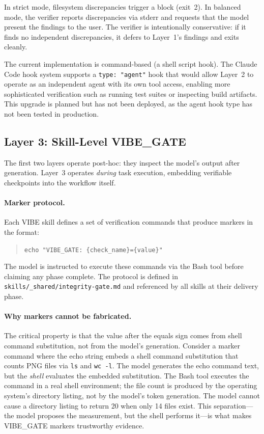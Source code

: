 In strict mode, filesystem discrepancies trigger a block (exit~2).
In balanced mode, the verifier reports discrepancies via stderr and requests that the model present the findings to the user.
The verifier is intentionally conservative: if it finds no independent discrepancies, it defers to Layer~1's findings and exits cleanly.

The current implementation is command-based (a shell script hook).
The Claude Code hook system supports a \texttt{type: "agent"} hook that would allow Layer~2 to operate as an independent agent with its own tool access, enabling more sophisticated verification such as running test suites or inspecting build artifacts.
This upgrade is planned but has not been deployed, as the agent hook type has not been tested in production.


\subsection{Layer 3: Skill-Level VIBE\_GATE}
\label{sec:vibegate}

The first two layers operate post-hoc: they inspect the model's output after generation.
Layer~3 operates \emph{during} task execution, embedding verifiable checkpoints into the workflow itself.

\paragraph{Marker protocol.}
Each VIBE skill defines a set of verification commands that produce markers in the format:
\begin{quote}
\texttt{echo "VIBE\_GATE: \{check\_name\}=\{value\}"}
\end{quote}
The model is instructed to execute these commands via the Bash tool before claiming any phase complete.
The protocol is defined in \texttt{skills/\_shared/integrity-gate.md} and referenced by all skills at their delivery phase.

\paragraph{Why markers cannot be fabricated.}
The critical property is that the value after the equals sign comes from shell command substitution, not from the model's generation.
Consider a marker command where the echo string embeds a shell command substitution that counts PNG files via \texttt{ls} and \texttt{wc~-l}.
The model generates the echo command text, but the \emph{shell} evaluates the embedded substitution.
The Bash tool executes the command in a real shell environment; the file count is produced by the operating system's directory listing, not by the model's token generation.
The model cannot cause a directory listing to return 20 when only 14 files exist.
This separation---the model proposes the measurement, but the shell performs it---is what makes VIBE\_GATE markers trustworthy evidence.

